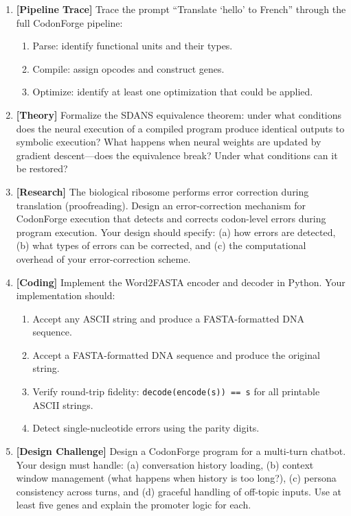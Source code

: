 \begin{enumerate}[label=\textbf{11.\arabic*.}, leftmargin=2.5em]
\item \textbf{[Pipeline Trace]} Trace the prompt ``Translate `hello' to French'' through the full CodonForge pipeline:
\begin{enumerate}
  \item Parse: identify functional units and their types.
  \item Compile: assign opcodes and construct genes.
  \item Optimize: identify at least one optimization that could be applied.
\end{enumerate}

\item \textbf{[Theory]} Formalize the SDANS equivalence theorem: under what conditions does the neural execution of a compiled program produce identical outputs to symbolic execution? What happens when neural weights are updated by gradient descent---does the equivalence break? Under what conditions can it be restored?

\item \textbf{[Research]} The biological ribosome performs error correction during translation (proofreading). Design an error-correction mechanism for CodonForge execution that detects and corrects codon-level errors during program execution. Your design should specify: (a) how errors are detected, (b) what types of errors can be corrected, and (c) the computational overhead of your error-correction scheme.

\item \textbf{[Coding]} Implement the Word2FASTA encoder and decoder in Python. Your implementation should:
\begin{enumerate}
  \item Accept any ASCII string and produce a FASTA-formatted DNA sequence.
  \item Accept a FASTA-formatted DNA sequence and produce the original string.
  \item Verify round-trip fidelity: \texttt{decode(encode(s)) == s} for all printable ASCII strings.
  \item Detect single-nucleotide errors using the parity digits.
\end{enumerate}

\item \textbf{[Design Challenge]} Design a CodonForge program for a multi-turn chatbot. Your design must handle: (a) conversation history loading, (b) context window management (what happens when history is too long?), (c) persona consistency across turns, and (d) graceful handling of off-topic inputs. Use at least five genes and explain the promoter logic for each.

\end{enumerate}


